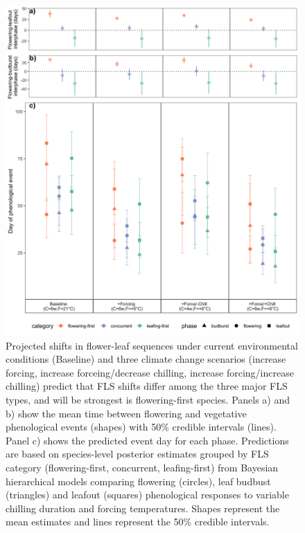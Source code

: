 \documentclass[12pt]{article}\usepackage[]{graphicx}\usepackage[]{color}
\begin{document}
\pagebreak

\begin{figure}[h!]
    \centering
 \includegraphics[width=.9\textwidth]{..//Plots/Flobuds_manuscript_figs/posteriorgroups_go.png} 
    \caption{Projected shifts in flower-leaf sequences under current environmental conditions (Baseline) and three climate change scenarios (increase forcing, increase forceing/decrease chilling, increase forcing/increase chilling) predict that FLS shifts differ among the three major FLS types, and will be strongest is flowering-first species. Panels a) and b) show the mean time between flowering and vegetative phenological events (shapes) with 50\% credible intervals (lines). Panel c) shows the predicted event day for each phase. Predictions are based on species-level posterior estimates grouped by FLS category (flowering-first, concurrent, leafing-first) from Bayesian hierarchical models comparing flowering (circles), leaf budbust (triangles) and leafout (squares) phenological responses to variable chilling duration and forcing temperatures. Shapes represent the mean estimates and lines represent the 50\% credible intervals. }

\end{figure}
\end{document}
